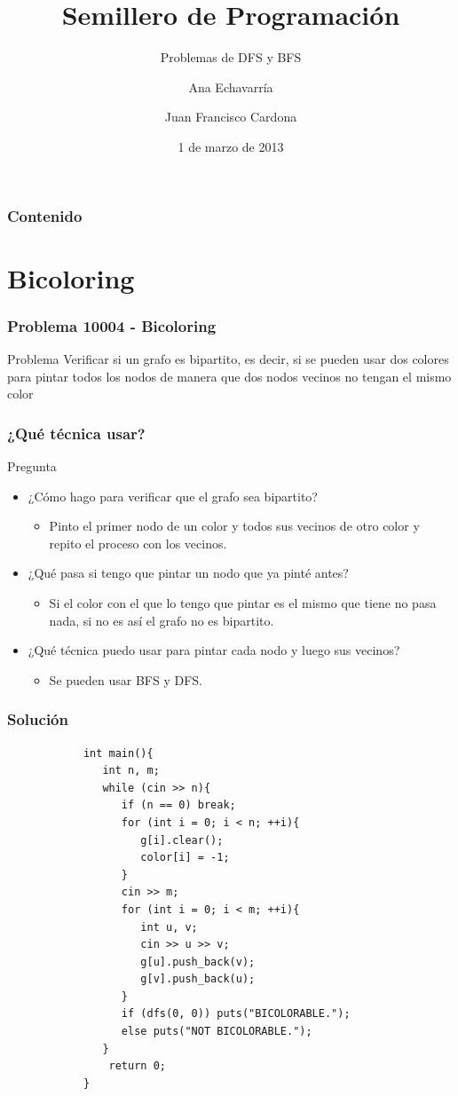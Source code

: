 \documentclass{beamer}
\title{Semillero de Programación}
\subtitle{Problemas de DFS y BFS}
\author{Ana Echavarría \and Juan Francisco Cardona}
\institute{Universidad EAFIT}
\date{1 de marzo de 2013}
\begin{document}
\begin{frame}
	\titlepage
\end{frame}

\begin{frame}
	\frametitle{Contenido}
	\tableofcontents
\end{frame}

\section{Bicoloring}
	\begin{frame}
		\frametitle{Problema 10004 - Bicoloring}
		\begin{block}{Problema}
			Verificar si un grafo es bipartito, es decir, si se pueden usar dos colores para pintar todos los nodos de manera que dos nodos vecinos no tengan el mismo color
		\end{block}
	\end{frame}
	
	\begin{frame}
		\frametitle{¿Qué técnica usar?}
		\begin{alertblock}{Pregunta}
				\begin{itemize}
					\item ¿Cómo hago para verificar que el grafo sea bipartito? \pause
						\begin{itemize}
							\item Pinto el primer nodo de un color y todos sus vecinos de otro color y repito el proceso con los vecinos. \pause
						\end{itemize}
					\item ¿Qué pasa si tengo que pintar un nodo que ya pinté antes? \pause
						\begin{itemize}
							\item Si el color con el que lo tengo que pintar es el mismo que tiene no pasa nada, si no es así el grafo no es bipartito.
						\end{itemize}
					\item ¿Qué técnica puedo usar para pintar cada nodo y luego sus vecinos? \pause
						\begin{itemize}
							\item Se pueden usar BFS y DFS.
						\end{itemize}
				\end{itemize}
		\end{alertblock}
	\end{frame}
	
	\begin{frame}[fragile]
		\frametitle{Solución}
		\begin{lstlisting}
			int main(){
			   int n, m;
			   while (cin >> n){
			      if (n == 0) break;
			      for (int i = 0; i < n; ++i){
			         g[i].clear();
			         color[i] = -1;
			      }
			      cin >> m;
			      for (int i = 0; i < m; ++i){
			         int u, v;
			         cin >> u >> v;
			         g[u].push_back(v);
			         g[v].push_back(u);
			      }
			      if (dfs(0, 0)) puts("BICOLORABLE.");
			      else puts("NOT BICOLORABLE.");
			   }
			    return 0;
			}
		\end{lstlisting}
	\end{frame}
	
\end{document}
